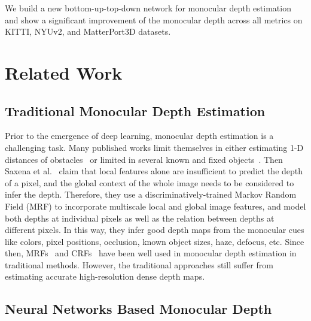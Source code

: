 \documentclass[10pt,twocolumn,letterpaper]{article}
\begin{document}
 We build a new bottom-up-top-down network for monocular depth estimation and show a significant improvement of the monocular depth across all metrics on KITTI, NYUv2, and MatterPort3D datasets.
 

\section{Related Work}
\label{sec:related}




\subsection{Traditional Monocular Depth Estimation}

Prior to the emergence of deep learning, monocular depth estimation is a challenging task.
Many published works limit themselves in either estimating 1-D distances of obstacles~\cite{michels2005high} or limited in several known and fixed objects~\cite{nagai2002hmm}.
Then Saxena et al.~\cite{saxena2005learning} claim that local features alone are insufficient to predict the depth of a pixel, and the global context of the whole image needs to be considered to infer the depth. Therefore, they use a discriminatively-trained Markov Random Field (MRF) to incorporate multiscale local and global image features, and model both depths at individual pixels as well as the relation between depths at different pixels.
In this way, they infer good depth maps from the monocular cues like colors, pixel positions, occlusion, known object sizes, haze, defocus, etc.
Since then, MRFs~\cite{saxena2008make3d} and CRFs~\cite{wang2015depth} have been well used in monocular depth estimation in traditional methods.
However, the traditional approaches still suffer from estimating accurate high-resolution dense depth maps.


\subsection{Neural Networks Based Monocular Depth}
\end{document}
